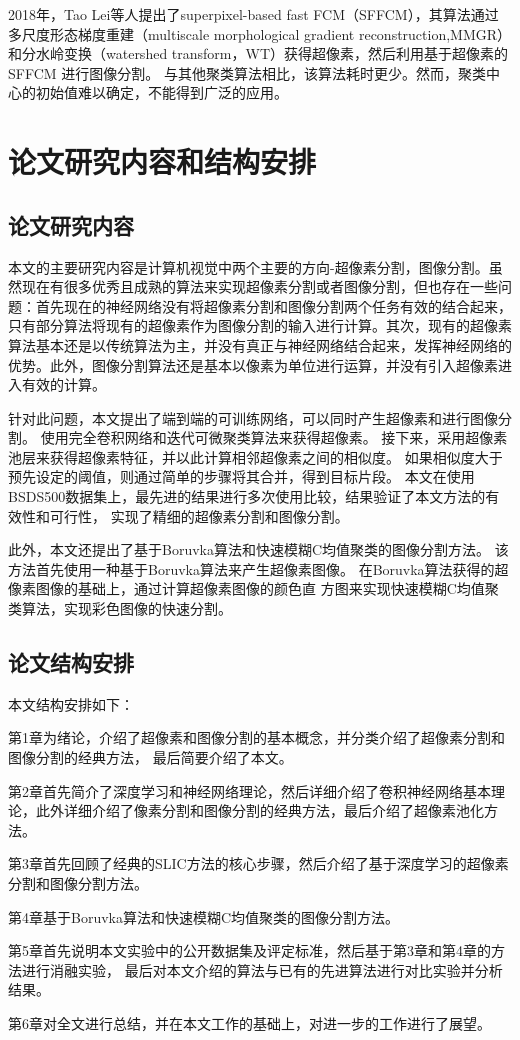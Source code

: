 2018年，Tao Lei等人提出了superpixel-based fast FCM（SFFCM）\cite{liu2018deep}，其算法通过多尺度形态梯度重建（multiscale morphological gradient reconstruction,MMGR）和分水岭变换（watershed transform，WT）获得超像素，然后利用基于超像素的SFFCM 进行图像分割。
与其他聚类算法相比，该算法耗时更少。然而，聚类中心的初始值难以确定，不能得到广泛的应用。


\section{论文研究内容和结构安排}

\subsection{论文研究内容}

本文的主要研究内容是计算机视觉中两个主要的方向-超像素分割，图像分割。虽然现在有很多优秀且成熟的算法来实现超像素分割或者图像分割，但也存在一些问题：首先现在的神经网络没有将超像素分割和图像分割两个任务有效的结合起来，只有部分算法将现有的超像素作为图像分割的输入进行计算。其次，现有的超像素算法基本还是以传统算法为主，并没有真正与神经网络结合起来，发挥神经网络的优势。此外，图像分割算法还是基本以像素为单位进行运算，并没有引入超像素进入有效的计算。

针对此问题，本文提出了端到端的可训练网络，可以同时产生超像素和进行图像分割。
使用完全卷积网络和迭代可微聚类算法来获得超像素。
接下来，采用超像素池层来获得超像素特征，并以此计算相邻超像素之间的相似度。
如果相似度大于预先设定的阈值，则通过简单的步骤将其合并，得到目标片段。
本文在使用BSDS500数据集\cite{arbelaez2010contour}上，最先进的结果进行多次使用比较，结果验证了本文方法的有效性和可行性，
实现了精细的超像素分割和图像分割。

此外，本文还提出了基于Boruvka算法和快速模糊C均值聚类的图像分割方法。
该方法首先使用一种基于Boruvka算法来产生超像素图像。
在Boruvka算法获得的超像素图像的基础上，通过计算超像素图像的颜色直
方图来实现快速模糊C均值聚类算法，实现彩色图像的快速分割。

\subsection{论文结构安排}

本文结构安排如下：

第1章为绪论，介绍了超像素和图像分割的基本概念，并分类介绍了超像素分割和图像分割的经典方法，
最后简要介绍了本文。

第2章首先简介了深度学习和神经网络理论，然后详细介绍了卷积神经网络基本理论，此外详细介绍了像素分割和图像分割的经典方法，最后介绍了超像素池化方法。

第3章首先回顾了经典的SLIC方法的核心步骤，然后介绍了基于深度学习的超像素分割和图像分割方法。

第4章基于Boruvka算法和快速模糊C均值聚类的图像分割方法。

第5章首先说明本文实验中的公开数据集及评定标准，然后基于第3章和第4章的方法进行消融实验，
最后对本文介绍的算法与已有的先进算法进行对比实验并分析结果。

第6章对全文进行总结，并在本文工作的基础上，对进一步的工作进行了展望。

